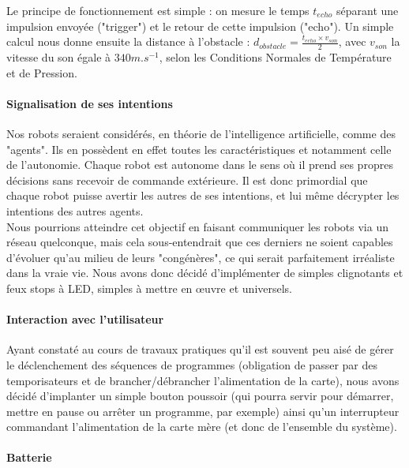 				Le principe de fonctionnement est simple : on mesure le temps $t_{echo} $ séparant une impulsion envoyée ("trigger") et le retour de cette impulsion ("echo"). Un simple calcul nous donne ensuite la distance à l'obstacle : $d_{obstacle} = \frac{t_{echo} \times v_{son}}{2}$, avec $v_{son}$ la vitesse du son égale à $340 m.s^{-1}$, selon les Conditions Normales de Température et de Pression.

		\paragraph{Signalisation de ses intentions}

			Nos robots seraient considérés, en théorie de l'intelligence artificielle, comme des "agents". Ils en possèdent en effet toutes les caractéristiques et notamment celle de l'autonomie. Chaque robot est autonome dans le sens où il prend ses propres décisions sans recevoir de commande extérieure. Il est donc primordial que chaque robot puisse avertir les autres de ses intentions, et lui même décrypter les intentions des autres agents.\\

			Nous pourrions atteindre cet objectif en faisant communiquer les robots via un réseau quelconque, mais cela sous-entendrait que ces derniers ne soient capables d'évoluer qu'au milieu de leurs "congénères", ce qui serait parfaitement irréaliste dans la vraie vie. Nous avons donc décidé d'implémenter de simples clignotants et feux stops à LED, simples à mettre en œuvre et universels.

		\paragraph{Interaction avec l'utilisateur}

			Ayant constaté au cours de travaux pratiques qu'il est souvent peu aisé de gérer le déclenchement des séquences de programmes (obligation de passer par des temporisateurs et de brancher/débrancher l'alimentation de la carte), nous avons décidé d'implanter un simple bouton poussoir (qui pourra servir pour démarrer, mettre en pause ou arrêter un programme, par exemple) ainsi qu'un interrupteur commandant l'alimentation de la carte mère (et donc de l'ensemble du système).

		\paragraph{Batterie}

